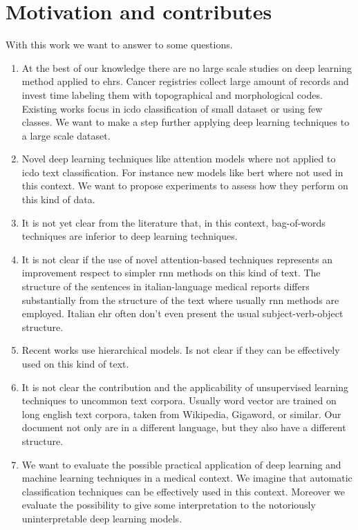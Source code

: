 \section{Motivation and contributes}
With this work we want to answer to some questions.
\begin{enumerate}
\item At the best of our
  knowledge there are no large scale studies on deep learning method
  applied to \acp{ehr}. Cancer registries collect large amount of
  records and invest time labeling them with topographical and
  morphological codes. Existing works focus in \ac{icdo} classification
  of small dataset or using few 
  classes. We want to make a step further applying deep learning
  techniques to a large scale dataset.
\item Novel deep learning techniques like attention models where not applied
  to \ac{icdo} text classification. For instance new models like
  \ac{bert} where not used in this context. We want to propose
  experiments to assess how they perform on this kind of data.
\item It is not yet clear from the literature that, in this context,
  bag-of-words techniques are inferior to deep learning techniques.
\item It is not clear if the use of novel attention-based techniques
  represents an improvement respect to simpler \ac{rnn} methods on this
  kind of text. The structure of the sentences in italian-language
  medical reports differs substantially from the structure of the text
  where usually \ac{rnn} methods are employed. Italian \ac{ehr} often
  don't even present the usual subject-verb-object structure.
\item Recent works use hierarchical models. Is not clear if they can
  be effectively used on this kind of text.
\item It is not clear the contribution and the applicability of
  unsupervised learning techniques to uncommon text corpora. Usually
  word vector are trained on long english text corpora, taken from
  Wikipedia, Gigaword, or similar. Our document not only are in a
  different language, but they also have a different structure.
\item We want to evaluate the possible practical application of deep
  learning and machine learning techniques in a medical context. We
  imagine that automatic classification techniques can be effectively
  used in this context. Moreover we evaluate the possibility to give
  some interpretation to the notoriously uninterpretable deep learning
  models. 
\end{enumerate}

